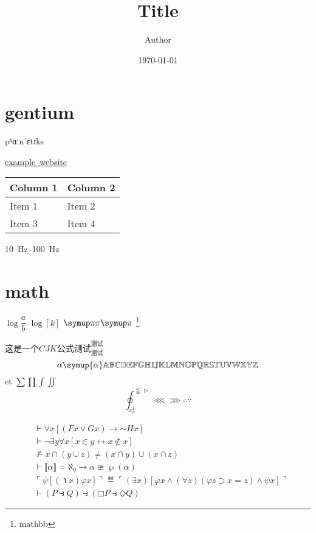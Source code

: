 \documentclass[twoside]{article}
\title{Title}
\author{Author}
\date{\today}
\begin{document}
    \maketitle
    \tableofcontents

    \section{gentium}
    \label{sec1}
    {\gentium pʰɑːnˈɛtɪks}
    
    \href{www.example.com}{example\ website}

    \begin{tabu} to 1\textwidth {X[2,l]X[1,r]}
        Column 1 & Column 2 \\
        \hline
        Item 1 & Item 2 \\
        Item 3 & Item 4 \\
    \end{tabu}

    \SIrange{10}{100}{\hertz}

    \section{math}
    \label{sec2}
    $\log{\dfrac{a}{b}}$
    $\log[k]{}$
    \log{}
    $\ciratio\pi\ppi$
    \HH
    \footnote{mathbb}

    $这是一个CJK公式测试^{测试}_{测试}$
    $$\alpha \symup{\alpha} \mathbb{A} \mathbb{B} \mathbb{C} \mathbb{D} \mathbb{E} \mathbb{F} \mathbb{G} \mathbb{H} \mathbb{I} \mathbb{J} \mathbb{K}%
     \mathbb{L} \mathbb{M} \mathbb{N} \mathbb{O} \mathbb{P} \mathbb{Q} \mathbb{R} \mathbb{S} \mathbb{T} \mathbb{U} \mathbb{V} \mathbb{W} \mathbb{X}%
     \mathbb{Y} \mathbb{Z} $$
     et 
    \(\sum \prod \int \iint \)
    \[\oint_{x_0^1}^{\lnapprox \vartriangleright}\lll \ggg \therefore \because  \]

    \begin{align}
        & ⊢ ∀x[(Fx ∨ Gx) → \mathord{∼}Hx] \\
        & ⊨ ¬∃y∀x[x∈y ↔ x∉x]  \\
        & ⊭ x ∩ (y ∪ z) ≠ (x ∩ y) ∪ (x ∩ z) \\
        & ⊢ ⟦α⟧ = ℵ₀ → α ≇ ℘(α) \\
        & ⌜ψ[(℩x)φx]⌝ ≝      ⌜(∃x)[φx ∧ (∀z)(φz ⊃ x=z) ∧ ψx]⌝ \\
        & ⊢ (P ⥽ Q) ⥽ (□P ⥽ ◇Q) 
    \end{align}
\end{document}
